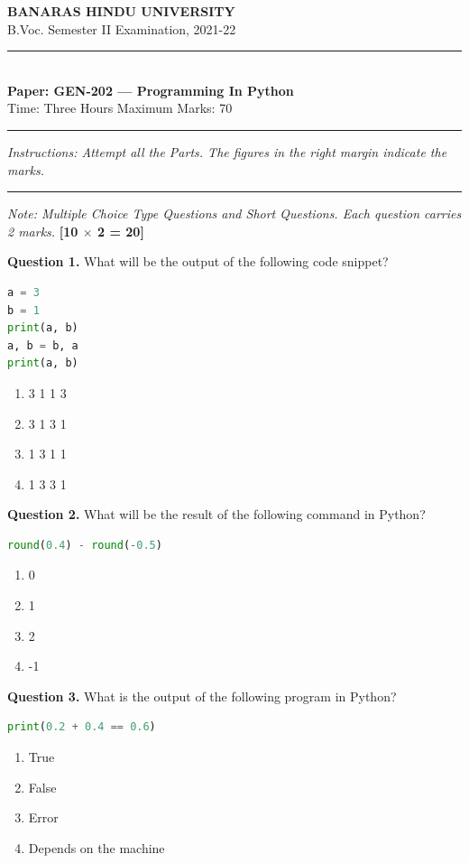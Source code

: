 \documentclass[11pt,a4paper]{article}
\begin{document}
\begin{center}
  {\large\bfseries BANARAS HINDU UNIVERSITY}\\[2pt]
  {\normalsize B.Voc. Semester II Examination, 2021-22}\\[6pt]
  \rule{0.8\linewidth}{0.5pt}\\[6pt]
  {\large\bfseries Paper: GEN-202 --- Programming In Python}\\[4pt]
  {\normalsize Time: Three Hours \hfill Maximum Marks: 70}
\end{center}

\rule{\linewidth}{0.4pt}

\smallskip
\noindent\textit{Instructions: Attempt all the Parts. The figures in the right margin indicate the marks.}

\bigskip

\bigskip{}
\rule{\linewidth}{0.4pt}\smallskip

\noindent\textit{Note: Multiple Choice Type Questions and Short Questions. Each question carries 2 marks.} \hfill \textbf{[10 $\times$ 2 = 20]}

\medskip\noindent\textbf{Question 1.} What will be the output of the following code snippet?
\begin{lstlisting}[language=Python]
a = 3
b = 1
print(a, b)
a, b = b, a
print(a, b)
\end{lstlisting}
\begin{enumerate}[label=(\alph*),itemsep=2pt]
  \item 3 1 1 3
  \item 3 1 3 1
  \item 1 3 1 1
  \item 1 3 3 1
\end{enumerate}

\medskip\noindent\textbf{Question 2.} What will be the result of the following command in Python?
\begin{lstlisting}[language=Python]
round(0.4) - round(-0.5)
\end{lstlisting}
\begin{enumerate}[label=(\alph*),itemsep=2pt]
  \item 0
  \item 1
  \item 2
  \item -1
\end{enumerate}

\medskip\noindent\textbf{Question 3.} What is the output of the following program in Python?
\begin{lstlisting}[language=Python]
print(0.2 + 0.4 == 0.6)
\end{lstlisting}
\begin{enumerate}[label=(\alph*),itemsep=2pt]
  \item True
  \item False
  \item Error
  \item Depends on the machine
\end{enumerate}
\end{document}
